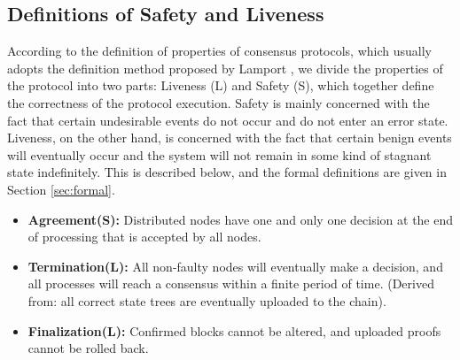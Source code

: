 \documentclass[journal]{IEEEtran}
\begin{document}
\subsection{Definitions of Safety and Liveness}
According to the definition of properties of consensus protocols, which usually adopts the definition method proposed by Lamport \cite{1977lamport}, we divide the properties of the protocol into two parts: Liveness (L) and Safety (S), which together define the correctness of the protocol execution. Safety is mainly concerned with the fact that certain undesirable events do not occur and do not enter an error state. Liveness, on the other hand, is concerned with the fact that certain benign events will eventually occur and the system will not remain in some kind of stagnant state indefinitely. This is described below, and the formal definitions are given in Section \ref{sec:formal}.
\begin{itemize}
    \item \textbf{Agreement(S): }
    Distributed nodes have one and only one decision at the end of processing that is accepted by all nodes.
    \item \textbf{Termination(L): }
    All non-faulty nodes will eventually make a decision, and all processes will reach a consensus within a finite period of time. (Derived from: all correct state trees are eventually uploaded to the chain).
    \item \textbf{Finalization(L): }
    Confirmed blocks cannot be altered, and uploaded proofs cannot be rolled back.
\end{itemize}
\end{document}
